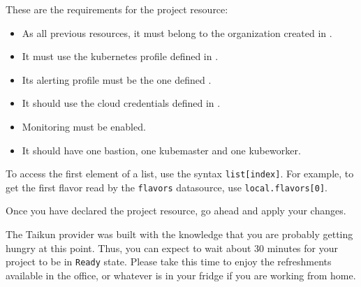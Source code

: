 These are the requirements for the project resource:
\begin{itemize}
  \item As all previous resources, it must belong to the organization created in .
  \item It must use the kubernetes profile defined in .
  \item Its alerting profile must be the one defined .
  \item It should use the cloud credentials defined in .
  \item Monitoring must be enabled.
  \item It should have one bastion, one kubemaster and one kubeworker.
\end{itemize}

\begin{tip}
  To access the first element of a list, use the syntax \texttt{list[index]}.
  For example, to get the first flavor read by the \texttt{flavors} datasource,
  use \texttt{local.flavors[0]}.
\end{tip}
\pagebreak

Once you have declared the project resource, go ahead and apply your changes.
\begin{hint}
  The Taikun provider was built with the knowledge that you are probably getting hungry at this point.
  Thus, you can expect to wait about 30 minutes for your project to be in \texttt{Ready} state.
  Please take this time to enjoy the refreshments available in the office, or whatever is
  in your fridge if you are working from home.
\end{hint}
